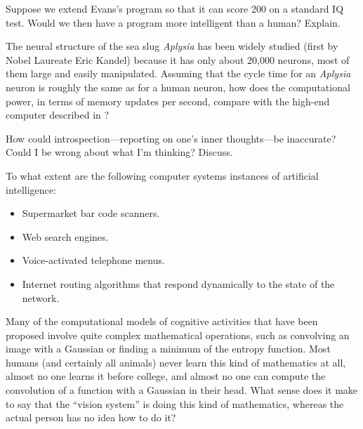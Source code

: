 \begin{uexercise}
Suppose we extend Evans's 
program so that it can score 200 on a standard 
IQ test. Would we then have a program more
intelligent than a human?
Explain.
\end{uexercise} 

\begin{exercise}
The neural structure of the sea slug {\em Aplysia\/} has been widely studied 
(first by Nobel Laureate Eric Kandel) because it has only about 20,000
neurons, most of them large and easily manipulated.  
Assuming that the cycle
time for an {\em Aplysia\/} neuron is roughly the same as for a human neuron, how
does the computational power, in terms of memory updates per second, 
compare with the high-end computer described in ?
\end{exercise} 

\begin{exercise}
    How could introspection---reporting on one's inner thoughts---be 
    inaccurate?   Could I be wrong about what I'm thinking?  Discuss.
\end{exercise} 

\begin{uexercise}
To what extent are the following computer systems instances of artificial
intelligence:
\begin{itemize}
\item Supermarket bar code scanners.
\item Web search engines.
\item Voice-activated telephone menus.
\item Internet routing algorithms that respond dynamically to the state
of the network.
\end{itemize}
\end{uexercise} 

\begin{exercise}
Many of the computational models of cognitive activities that have been 
proposed involve quite complex mathematical operations, such as convolving
an image with a Gaussian or finding a minimum of the entropy function.  
Most humans (and certainly all animals) never learn this kind of mathematics
at all, almost no one learns it before college, and almost no one can compute
the convolution of a function with a Gaussian in their head.  What sense does 
it make to say that the ``vision system'' is doing this kind of mathematics,
whereas the actual person has no idea how to do it?
\end{exercise} 

